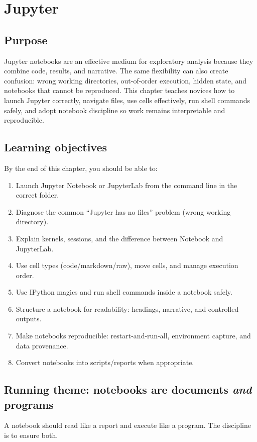 \chapter{Jupyter}
\label{ch:jupyter}

\section*{Purpose}
Jupyter notebooks are an effective medium for exploratory analysis because they combine code, results, and narrative. The same flexibility can also create confusion: wrong working directories, out-of-order execution, hidden state, and notebooks that cannot be reproduced. This chapter teaches novices how to launch Jupyter correctly, navigate files, use cells effectively, run shell commands safely, and adopt notebook discipline so work remains interpretable and reproducible.

\section*{Learning objectives}
By the end of this chapter, you should be able to:
\begin{enumerate}
\item Launch Jupyter Notebook or JupyterLab from the command line in the correct folder.
\item Diagnose the common ``Jupyter has no files'' problem (wrong working directory).
\item Explain kernels, sessions, and the difference between Notebook and JupyterLab.
\item Use cell types (code/markdown/raw), move cells, and manage execution order.
\item Use IPython magics and run shell commands inside a notebook safely.
\item Structure a notebook for readability: headings, narrative, and controlled outputs.
\item Make notebooks reproducible: restart-and-run-all, environment capture, and data provenance.
\item Convert notebooks into scripts/reports when appropriate.
\end{enumerate}

\section*{Running theme: notebooks are documents \emph{and} programs}
A notebook should read like a report and execute like a program. The discipline is to ensure both.

